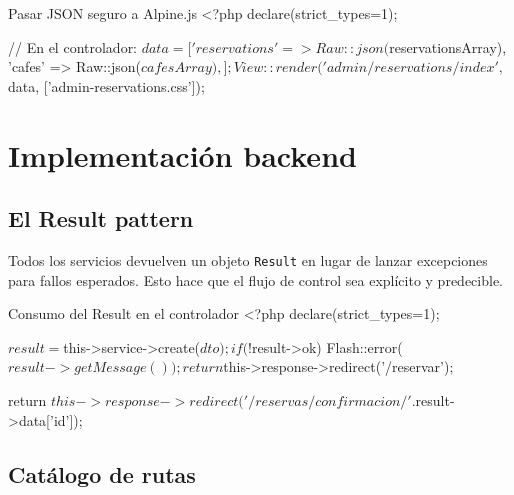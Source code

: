 \documentclass[12pt,a4paper,twoside,openright]{report}
\begin{document}
\begin{phpcode}{Pasar JSON seguro a Alpine.js}
<?php declare(strict_types=1);

// En el controlador:
$data = [
    'reservations' => Raw::json($reservationsArray),
    'cafes'        => Raw::json($cafesArray),
];
View::render('admin/reservations/index', $data, ['admin-reservations.css']);
\end{phpcode}

\section{Implementación backend}
\label{sec:backend}

\subsection{El Result pattern}

Todos los servicios devuelven un objeto \texttt{Result} en lugar de lanzar excepciones
para fallos esperados. Esto hace que el flujo de control sea explícito y predecible.


\begin{phpcode}{Consumo del Result en el controlador}
<?php declare(strict_types=1);

$result = $this->service->create($dto);

if (!$result->ok) {
    Flash::error($result->getMessage());
    return $this->response->redirect('/reservar');
}

return $this->response->redirect('/reservas/confirmacion/' . $result->data['id']);
\end{phpcode}

\subsection{Catálogo de rutas}
\label{subsec:rutas}
\end{document}
